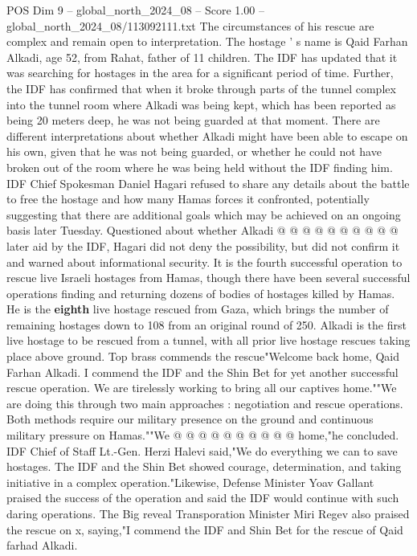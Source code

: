 \begin{textsample}{POS Dim 9 – global\_north\_2024\_08 – Score 1.00 – global\_north\_2024\_08/113092111.txt}  \label{ex:f9_pos_196}
The circumstances of his rescue are complex and remain open to interpretation.
The hostage ' s name is Qaid Farhan Alkadi, age 52, from Rahat, father of 11 children.
The IDF has updated that it was searching for hostages in the area for a significant period of time.
Further, the IDF has confirmed that when it broke through parts of the tunnel complex into the tunnel room where Alkadi was being kept, which has been reported as being 20 meters deep, he was not being guarded at that moment.
There are different interpretations about whether Alkadi might have been able to escape on his own, given that he was not being guarded, or whether he could not have broken out of the room where he was being held without the IDF finding him.
IDF Chief Spokesman Daniel Hagari refused to share any details about the battle to free the hostage and how many Hamas forces it confronted, potentially suggesting that there are additional goals which may be achieved on an ongoing basis later Tuesday.
Questioned about whether Alkadi @ @ @ @ @ @ @ @ @ @ later aid by the IDF, Hagari did not deny the possibility, but did not confirm it and warned about informational security.
It is the fourth successful operation to rescue live Israeli hostages from Hamas, though there have been several successful operations finding and returning dozens of bodies of hostages killed by Hamas.
He is the \textbf{eighth} live hostage rescued from Gaza, which brings the number of remaining hostages down to 108 from an original round of 250.
Alkadi is the first live hostage to be rescued from a tunnel, with all prior live hostage rescues taking place above ground.
Top brass commends the rescue"Welcome back home, Qaid Farhan Alkadi.
I commend the IDF and the Shin Bet for yet another successful rescue operation.
We are tirelessly working to bring all our captives home.""We are doing this through two main approaches : negotiation and rescue operations.
Both methods require our military presence on the ground and continuous military pressure on Hamas.""We @ @ @ @ @ @ @ @ @ @ home,"he concluded.
IDF Chief of Staff Lt.-Gen.
Herzi Halevi said,"We do everything we can to save hostages.
The IDF and the Shin Bet showed courage, determination, and taking initiative in a complex operation."Likewise, Defense Minister Yoav Gallant praised the success of the operation and said the IDF would continue with such daring operations.
The Big reveal Transporation Minister Miri Regev also praised the rescue on x, saying,"I commend the IDF and Shin Bet for the rescue of Qaid farhad Alkadi.

\end{textsample}
